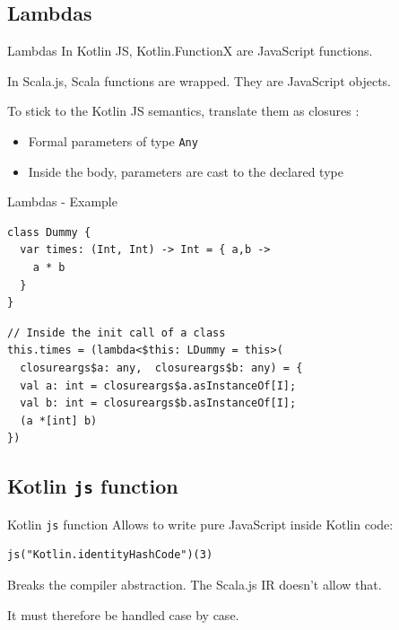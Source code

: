 \documentclass[10pt]{beamer}
\newcommand{\inlinecode}[2]{\colorbox{minted-bg}{\lstinline[language=#1]$#2$}}
\newcommand{\ktinline}[1]{\inlinecode{kotlin}{#1}}
\begin{document}

\subsection{Lambdas}

\begin{frame}[fragile]{Lambdas} 
 In Kotlin JS, Kotlin.FunctionX are JavaScript functions.
 
 In Scala.js, Scala functions are wrapped. They are JavaScript objects.
 
 
 To stick to the Kotlin JS semantics, translate them as closures :
 \begin{itemize}
  \item Formal parameters of type \ktinline{Any}
  \item Inside the body, parameters are cast to the declared type
 \end{itemize}
\end{frame}

\begin{frame}[fragile]{Lambdas - Example}
 \begin{verbatim}
class Dummy {
  var times: (Int, Int) -> Int = { a,b ->
    a * b
  }
}
 \end{verbatim}
 \begin{verbatim}
// Inside the init call of a class
this.times = (lambda<$this: LDummy = this>(
  closureargs$a: any,  closureargs$b: any) = {
  val a: int = closureargs$a.asInstanceOf[I];
  val b: int = closureargs$b.asInstanceOf[I];
  (a *[int] b)
})
 \end{verbatim}
 
\end{frame}
 

\subsection{Kotlin \ktinline{js} function}

\begin{frame}[fragile]{Kotlin \ktinline{js} function}
  Allows to write pure JavaScript inside Kotlin code:
  
  \begin{verbatim}
js("Kotlin.identityHashCode")(3)
  \end{verbatim}


  Breaks the compiler abstraction. The Scala.js IR doesn't allow that.
  
  It must therefore be handled case by case.

\end{frame}
\end{document}
